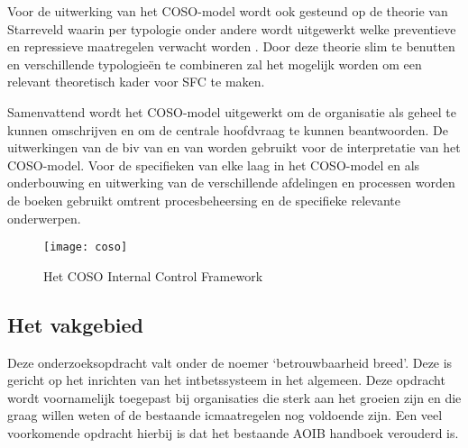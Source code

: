 Voor de uitwerking van het COSO-model wordt ook gesteund op de theorie van Starreveld waarin per \gls{typologie} onder andere wordt uitgewerkt welke preventieve en repressieve maatregelen verwacht worden \citep{jans,financiering,buunk}. Door deze theorie slim te benutten en verschillende typologieën te combineren zal het mogelijk worden om een relevant theoretisch kader voor SFC te maken. 

Samenvattend wordt het COSO-model uitgewerkt om de organisatie als geheel te kunnen omschrijven en om de centrale hoofdvraag te kunnen beantwoorden. De uitwerkingen van de \gls{biv} van \citet{bivperspectief} en van \citet{bivpraktijk} worden gebruikt voor de interpretatie van het COSO-model. Voor de specifieken van elke laag in het COSO-model en als onderbouwing en uitwerking van de verschillende afdelingen en processen worden de boeken gebruikt omtrent procesbeheersing en de specifieke relevante onderwerpen. \citep{internebeheersing,jans,financiering,buunk}

\begin{figure}[!h]
    \centering
    \texttt{[image: coso]}
    \caption{Het COSO Internal Control Framework \citep{COSOsummery}}
    \label{fig:coso}
\end{figure}

\subsection{Het vakgebied}
Deze onderzoeksopdracht valt onder de noemer `betrouwbaarheid breed'. Deze is gericht op het inrichten van het \gls{intbet}ssysteem in het algemeen. Deze opdracht wordt voornamelijk toegepast bij organisaties die sterk aan het groeien zijn en die graag willen weten of de bestaande \gls{ic}maatregelen nog voldoende zijn. Een veel voorkomende opdracht hierbij is dat het bestaande AOIB handboek verouderd is. \citep{bivpraktijk}


\newpage
